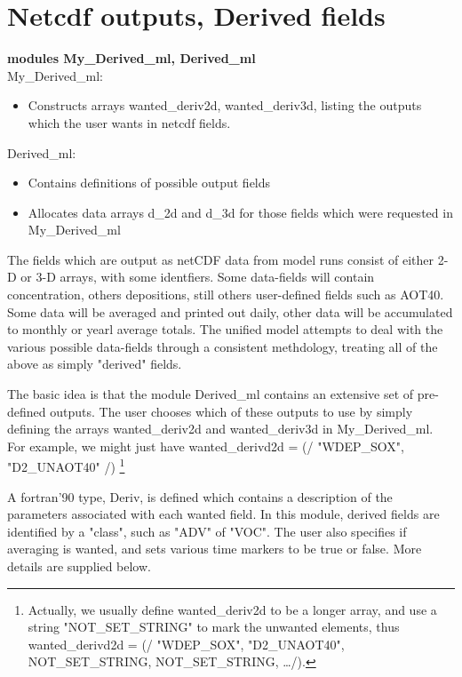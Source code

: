 \section{Netcdf outputs, Derived fields}

{\bf modules My\_Derived\_ml, Derived\_ml}\\

My\_Derived\_ml:\\
\begin{itemize}
  \item Constructs arrays wanted\_deriv2d, wanted\_deriv3d, listing
   the outputs which the user wants in netcdf fields.
\end{itemize}

Derived\_ml:\\
\begin{itemize}
  \item Contains definitions of possible output fields
  \item Allocates data arrays d\_2d and d\_3d for those
    fields which were requested in My\_Derived\_ml	
\end{itemize}



\noindent
The fields which are output as netCDF data from model runs consist
of either 2-D or 3-D  arrays, with some identfiers. 
Some data-fields will contain concentration, others depositions, still
others user-defined fields such as AOT40.
Some data will be averaged and printed out daily, other data will
be accumulated to monthly or yearl average totals.
The unified model 
attempts to deal with the various possible data-fields through
a consistent methdology, treating all of the above as simply "derived"
fields.

The basic idea is that  the module Derived\_ml contains an extensive
set of pre-defined outputs. The user chooses which of these
outputs to use by simply defining the arrays wanted\_deriv2d
and wanted\_deriv3d in My\_Derived\_ml.  For example,
we might just have wanted\_derivd2d = (/ "WDEP\_SOX", "D2\_UNAOT40" /)
\footnote{Actually, we usually define wanted\_deriv2d to be
a longer array, and use a string "NOT\_SET\_STRING" to mark
the unwanted elements, thus wanted\_derivd2d = 
(/ "WDEP\_SOX", "D2\_UNAOT40", NOT\_SET\_STRING, NOT\_SET\_STRING, \dots /).
}




A fortran'90 type, Deriv, is defined which contains
a description of the parameters associated with each wanted field.
In this module, derived fields are identified by a "class", such as "ADV" of "VOC".
The user also specifies if averaging is wanted, and sets various
time markers to be true or false. More details are supplied below.

